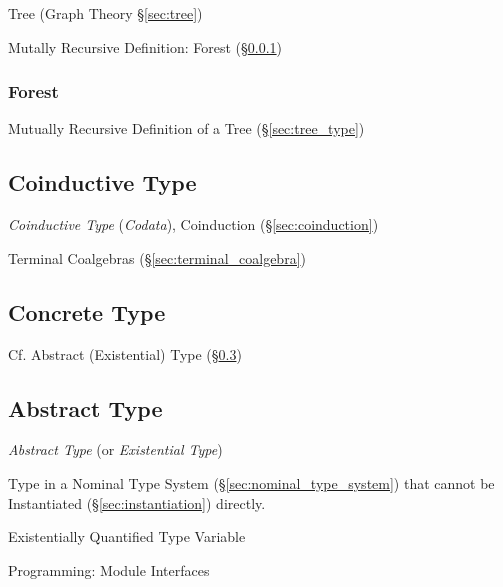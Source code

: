 Tree (Graph Theory \S\ref{sec:tree})

Mutally Recursive Definition: Forest (\S\ref{sec:forest_type})



\subsubsection{Forest}\label{sec:forest_type}

Mutually Recursive Definition of a Tree (\S\ref{sec:tree_type})



\subsection{Coinductive Type}\label{sec:coinductive_type}

\emph{Coinductive Type} (\emph{Codata}), Coinduction
(\S\ref{sec:coinduction})

Terminal Coalgebras (\S\ref{sec:terminal_coalgebra})



\subsection{Concrete Type}\label{sec:concrete_type}

\fist Cf. Abstract (Existential) Type (\S\ref{sec:abstract_type})



\subsection{Abstract Type}\label{sec:abstract_type}

\emph{Abstract Type} (or \emph{Existential Type})

Type in a Nominal Type System (\S\ref{sec:nominal_type_system}) that
cannot be Instantiated (\S\ref{sec:instantiation}) directly.

Existentially Quantified Type Variable

Programming: Module Interfaces

